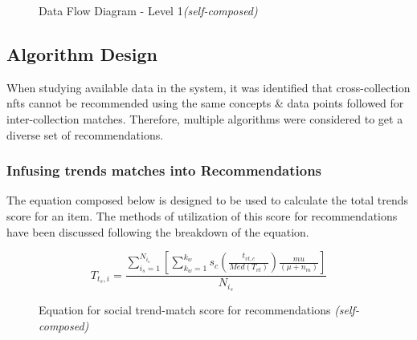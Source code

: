 \begin{figure}[h!]
\centering
\setlength{\fboxsep}{10pt}%
\setlength{\fboxrule}{0.5pt}%
\caption{Data Flow Diagram - Level 1\textit{(self-composed)}}
\label{fig:data-flow-diagram-l1}
\end{figure}


\subsection{Algorithm Design}

When studying available data in the system, it was identified that cross-collection \gls{nft}s cannot be recommended using the same concepts \& data points followed for inter-collection matches. Therefore, multiple algorithms were considered to get a diverse set of recommendations.

\subsubsection{Infusing trends matches into Recommendations}
The equation composed below is designed to be used to calculate the total trends score for an item. The methods of utilization of this score for recommendations have been discussed following the breakdown of the equation.

\begin{figure}[h!]
\begin{equation}
T_{t_{s},i} = \frac{\sum^{N_{i_{s}}}_{i_{s}=1} \left[\sum^{k_{w}}_{k_{w}=1} s_{c} \left(\frac{t_{vt,c}}{Med(T_{vt})}\right) \frac{m u}{\left(\mu + n_{m}\right)} \right]}{N_{i_{s}}}
\end{equation}
\caption*{Equation for social trend-match score for recommendations \textit{(self-composed)}}
\end{figure}

